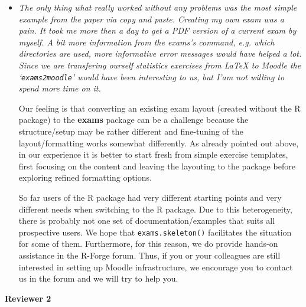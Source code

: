 \documentclass[a4paper]{article}
\begin{document}
\begin{itemize}
\item {\it
The only thing what really worked without any problems was the most simple
example from the paper via copy and paste.  Creating my own exam was a pain. 
It took me more then a day to get a PDF version of a current exam by myself. 
A bit more information from the exams's command, e.g.  which directories are
used, more informative error messages would have helped a lot.  Since we are
transfering ourself statistics exercises from {\LaTeX} to Moodle the
`\texttt{exams2moodle}' would have been interesting to us, but I'am not willing to
spend more time on it.}

Our feeling is that converting an existing exam layout (created without
the R package) to the \textbf{exams} package can be a challenge because the structure/setup
may be rather different and fine-tuning of the layout/formatting works somewhat
differently. As already pointed out above, in our experience it is better to
start fresh from simple exercise templates, first focusing on the content and leaving the layouting to
the package before exploring refined formatting options.

So far users of the R package had very different starting points and very different
needs when switching to the R package. Due to this heterogeneity, there is
probably not one set of documentation/examples that suits all prospective users.
We hope that \texttt{exams.skeleton()} facilitates the situation for some of them.
Furthermore, for this reason, we do provide hands-on assistance in the R-Forge
forum. Thus, if you or your colleagues are still interested in setting up
Moodle infrastructure, we encourage you to contact us in the forum and we will
try to help you.

\end{itemize}

\bigskip

\textbf{\Large Reviewer 2}

\medskip
\end{document}
